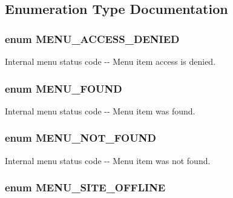 \subsection{Enumeration Type Documentation}
\hypertarget{group__menu__status__codes_ga87e8c6c6b42f3399cbe817d4d19cd892}{
\subsubsection[{MENU\_\-ACCESS\_\-DENIED}]{\setlength{\rightskip}{0pt plus 5cm}enum {\bf MENU\_\-ACCESS\_\-DENIED}}}
\label{group__menu__status__codes_ga87e8c6c6b42f3399cbe817d4d19cd892}
Internal menu status code -\/-\/ Menu item access is denied. \hypertarget{group__menu__status__codes_gabf2843e858b524578380ab90a4ce8048}{
\subsubsection[{MENU\_\-FOUND}]{\setlength{\rightskip}{0pt plus 5cm}enum {\bf MENU\_\-FOUND}}}
\label{group__menu__status__codes_gabf2843e858b524578380ab90a4ce8048}
Internal menu status code -\/-\/ Menu item was found. \hypertarget{group__menu__status__codes_ga67a38f79c8ab91fb6230daaaad6176f4}{
\subsubsection[{MENU\_\-NOT\_\-FOUND}]{\setlength{\rightskip}{0pt plus 5cm}enum {\bf MENU\_\-NOT\_\-FOUND}}}
\label{group__menu__status__codes_ga67a38f79c8ab91fb6230daaaad6176f4}
Internal menu status code -\/-\/ Menu item was not found. \hypertarget{group__menu__status__codes_gad6222551ed027f4f367e11b11935cff9}{
\subsubsection[{MENU\_\-SITE\_\-OFFLINE}]{\setlength{\rightskip}{0pt plus 5cm}enum {\bf MENU\_\-SITE\_\-OFFLINE}}}
